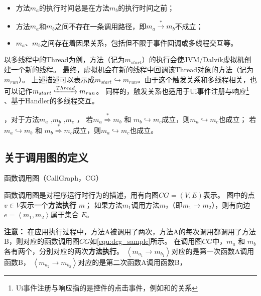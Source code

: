 	\begin{itemize}
		\setlength{\itemsep}{-5pt}
		\item 方法$m_a$的执行时间总是在方法$m_b$的执行时间之前；
		\item 方法$m_a$和$m_b$之间不存在一条调用路径，即$m_a \stackrel{\ast}{\to} m_b $不成立；
		\item $m_a$、$m_b$之间存在着因果关系，包括但不限于事件回调或多线程交互等。
	\end{itemize}


以多线程中的Thread为例，方法（记为$m_{start}$）的执行会使JVM/Dalvik虚拟机创建一个新的线程。
最终，虚拟机会在新的线程中回调该Thread对象的方法（记为$m_{run}$）。
上述描述可以表示成$m_{start} \hookrightarrow m_{run}$。由于这个触发关系和多线程相关，也可以记作$m_{start} \lhook\joinrel\xrightarrow{Thread}  m_{run} $。
同样的，触发关系也适用于Ui事件注册与响应\footnote{Ui事件注册与响应指的是控件的点击事件，例如和的关系} 、基于Handler的多线程交互。


，对于方法$m_a$ ,$m_b$ ,$m_c$ ，
若$m_a  \stackrel{\ast}{ \Rightarrow } m_b$ 和 $m_b \hookrightarrow m_c$成立，则$m_a \hookrightarrow m_c$也成立；
若$m_a  \hookrightarrow m_b$ 和 $m_b \stackrel{\ast}{ \Rightarrow }  m_c$成立，则$m_a \hookrightarrow m_c$也成立。

\subsection{关于调用图的定义}

\begin{Def}
	函数调用图（CallGraph，CG）
\end{Def}	

	函数调用图是对程序运行时行为的描述，用有向图$CG = ( V , E)$表示。 图中的点$ v \in V $表示一个\textbf{方法执行} $m$；
	如果方法$m_1$调用方法$m_2$（即$m_1 \to m_2$），则有向边 $e = \left\langle m_1 ,m_2 \right\rangle $属于集合 $E$。 


\textbf{注意：}
在应用执行过程中，方法A被调用了两次，方法A的每次调用都调用了方法B，则对应的函数调用图$CG$如\autoref{equ:dcg_sample}所示。
在调用图$CG$中，$m_a$ 和 $m_b$ 各有两个，分别对应的两次\textbf{方法执行}。
$\left\langle m_{a_{1}} \to m_{b_{1}}\right\rangle $对应的是第一次函数A调用函数B，
$\left\langle m_{a_{2}} \to m_{b_{2}} \right\rangle    $对应的是第二次函数A调用函数B，

